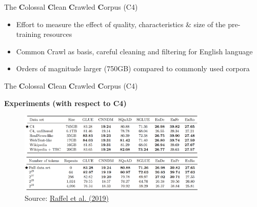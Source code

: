 
\begin{frame}{The \textbf{C}olossal \textbf{C}lean \textbf{C}rawled \textbf{C}orpus (C4)}

\vfill

	\begin{itemize}
		\item Effort to measure the effect of quality, characteristics \& size of the pre-training resources
		\item Common Crawl as basis, careful cleaning and filtering for English language
		\item Orders of magnitude larger (750GB) compared to commonly used corpora 
	\end{itemize}
	
\vfill

\end{frame}


\begin{frame}{The \textbf{C}olossal \textbf{C}lean \textbf{C}rawled \textbf{C}orpus (C4)}

\vfill
	
	\textbf{Experiments (with respect to C4)}
	
	\begin{figure}
		\centering
		\includegraphics[width = 9cm]{figure/c4-characteristics.png}\\ 
		\includegraphics[width = 9cm]{figure/c4-size.png}\\ 
		\footnotesize{Source:} \href{https://arxiv.org/pdf/1910.10683.pdf}{\footnotesize Raffel et al. (2019)}
	\end{figure}
	
\vfill

\end{frame}


